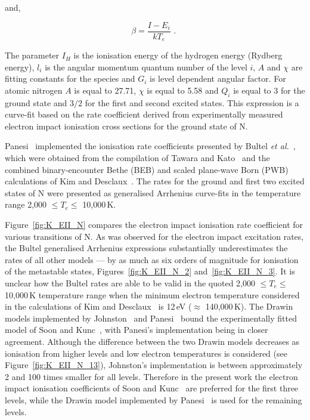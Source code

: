 {\noindent and, 

\begin{equation}
 \beta = \frac{I - E_i}{kT_e} \text{ . } \label{eq:K_EII_Soon_Kunc_c}
\end{equation}

\noindent The parameter $I_H$ is the ionisation energy of the hydrogen energy (Rydberg energy), $l_i$ is the angular momentum quantum number of the level $i$, $A$ and $\chi$ are fitting constants for the species and $G_i$ is level dependent angular factor.
For atomic nitrogen $A$ is equal to 27.71, $\chi$ is equal to 5.58 and $Q_i$ is equal to 3 for the ground state and $3/2$ for the first and second excited states.
This expression is a curve-fit based on the rate coefficient derived from experimentally measured electron impact ionisation cross sections for the ground state of N.

\par

Panesi~\cite{panesi_phd} implemented the ionisation rate coefficients presented by Bultel \textit{et al.}~\cite{BBB+2006}, which were obtained from the compilation of Tawara and Kato~\cite{TK1999} and the combined binary-encounter Bethe (BEB) and scaled plane-wave Born (PWB) calculations of Kim and Desclaux~\cite{KD2002}.
The rates for the ground and first two excited states of N were presented as generalised Arrhenius curve-fits in the temperature range 2,000 $\leq T_e \leq$ 10,000\,K.

\par

Figure~\ref{fig:K_EII_N} compares the electron impact ionisation rate coefficient for various transitions of N.
As was observed for the electron impact excitation rates, the Bultel generalised Arrhenius expressions substantially underestimates the rates of all other models --- by as much as six orders of magnitude for ionisation of the metastable states, Figures~\ref{fig:K_EII_N_2} and~\ref{fig:K_EII_N_3}.
It is unclear how the Bultel rates are able to be valid in the quoted 2,000 $\leq T_e \leq$ 10,000\,K temperature range when the minimum electron temperature considered in the calculations of Kim and Desclaux~\cite{KD2002} is 12\,eV ($\approx$ 140,000\,K).
The Drawin models implemented by Johnston~\cite{JohnPhd} and Panesi~\cite{panesi_phd} bound the experimentally fitted model of Soon and Kunc~\cite{SK1990}, with Panesi's implementation being in closer agreement.
Although the difference between the two Drawin models decreases as ionisation from higher levels and low electron temperatures is considered (see Figure~\ref{fig:K_EII_N_13}), Johnston's implementation is between approximately 2 and 100 times smaller for all levels.
Therefore in the present work the electron impact ionisation coefficients of Soon and Kunc~\cite{SK1990} are preferred for the first three levels, while the Drawin model implemented by Panesi~\cite{JohnPhd} is used for the remaining levels.

}
